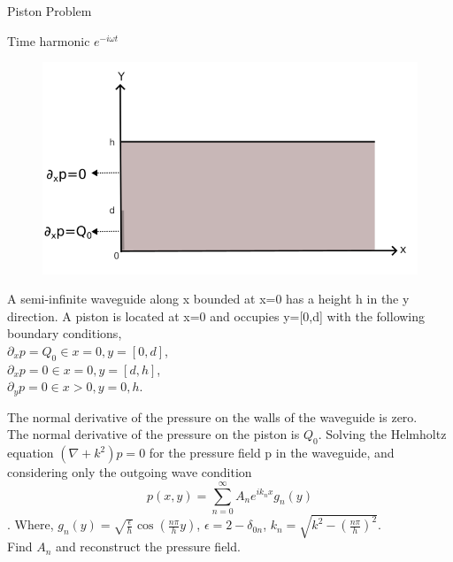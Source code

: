 \documentclass{beamer}
\title[Piston Problem]{}
\subtitle{}
\author[Monisha Muralidharan M]{}
\institute[]{\scriptsize }
\date{\tiny \today}
\begin{document}
\begin{frame}{Piston Problem}
    \scriptsize{
    \begin{minipage}{0.4\textwidth}
       
     Time harmonic $e^{-i\omega t}$
    \begin{figure}
        \centering
        \includegraphics[width=1\textwidth]{piston.png} 
    \end{figure}
    \end{minipage}
    \begin{minipage}{0.55\textwidth}

        A semi-infinite waveguide along x bounded at x=0 has a height h in the y direction.
        A piston is located at x=0 and occupies y=[0,d] with the following boundary conditions,\\
        $\partial_xp=Q_0 \in x=0, y=[0,d]$,\\
        $\partial_xp=0 \in x=0, y=[d,h]$,\\
        $\partial_yp=0 \in x>0, y=0,h$.\\
        
        

         \end{minipage}
        The normal derivative of the pressure on the walls of the waveguide is zero.\\
        The normal derivative of the pressure on the piston is $Q_0$.
        Solving the Helmholtz equation $(\nabla +k^2)p=0$ for the pressure field p in the waveguide,
        and considering only the outgoing wave condition \[ p(x,y)=\sum_{n=0}^{\infty}A_n e^{ik_nx} g_n(y)\]. Where, \quad$g_n(y)=\sqrt{\frac{\epsilon}{h}}\cos(\frac{n\pi}{h}y)$, $\epsilon=2-\delta_{0n}$, $k_n=\sqrt{k^2-(\frac{n\pi}{h})^2}$.
        \\Find $A_n$ and reconstruct the pressure field.
    }
\end{frame}
\end{document}
